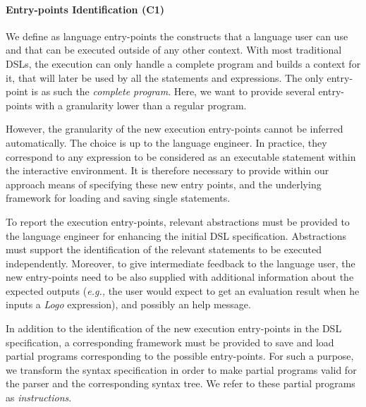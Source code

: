 \paragraph{Entry-points Identification (C1)}

We define as language entry-points the constructs that a language user can use and that can be executed outside of any other context.
With most traditional DSLs, the execution can only handle a complete program and builds a context for it, that will later be used by all the statements and expressions.
The only entry-point is as such the \textit{complete program}.
Here, we want to provide several entry-points with a granularity lower than a regular program.

However, the granularity of the new execution entry-points cannot be inferred automatically. The choice is up to the language engineer. In practice, they correspond to any expression to be considered as an executable statement within the interactive environment. It is therefore necessary to provide within our approach means of specifying these new entry points, and the underlying framework for loading and saving single statements. 

To report the execution entry-points, relevant abstractions must be provided to the language engineer for enhancing the initial DSL specification. Abstractions must support the identification of the relevant statements to be executed independently. Moreover, to give intermediate feedback to the language user, the new entry-points need to be also supplied with additional information about the expected outputs (\emph{e.g.,} the user would expect to get an evaluation result when he inputs a \textit{Logo} expression), and possibly an help message. 

In addition to the identification of the new execution entry-points in the DSL specification, a corresponding framework must be provided to save and load partial programs corresponding to the possible entry-points.  For such a purpose, we transform the syntax specification in order to make partial programs valid for the parser and the corresponding syntax tree.
We refer to these partial programs as \textit{instructions}.


